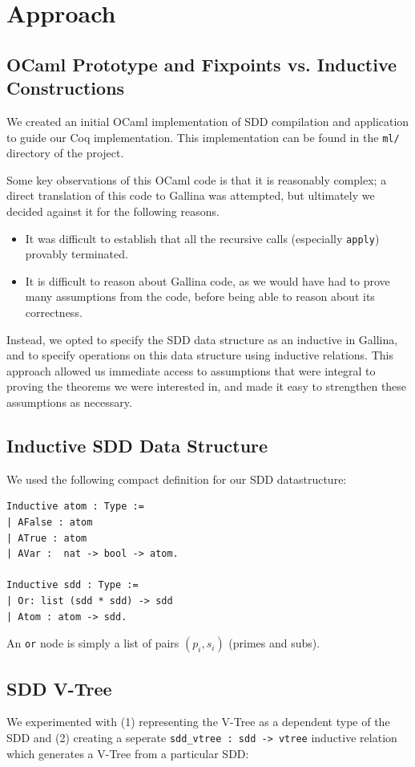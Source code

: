 \documentclass[twocolumn]{article}
\theoremstyle{definition}
\begin{document}
\section{Approach}

\subsection{OCaml Prototype and Fixpoints vs. Inductive Constructions}
We created an initial OCaml implementation of SDD compilation and application to
guide our Coq implementation. This implementation can be found in the
\texttt{ml/} directory of the project.

Some key observations of this OCaml code is that it is reasonably complex; a
direct translation of this code to Gallina was attempted, but ultimately we
decided against it for the following reasons.

\begin{itemize}
\item It was difficult to establish that all the recursive calls (especially
  \texttt{apply}) provably terminated.
\item It is difficult to reason about Gallina code, as we would have had to prove many assumptions from the code, before being able to reason about its correctness.
\end{itemize} 

Instead, we opted to specify the SDD data structure as an inductive in Gallina, and to specify operations on this data structure using inductive relations. This approach allowed us immediate access to assumptions that were integral to proving the theorems we were interested in, and made it easy to strengthen these assumptions as necessary.

\subsection{Inductive SDD Data Structure}
We used the following compact definition for our SDD datastructure:

\begin{verbatim}
Inductive atom : Type :=
| AFalse : atom
| ATrue : atom
| AVar :  nat -> bool -> atom.

Inductive sdd : Type :=
| Or: list (sdd * sdd) -> sdd
| Atom : atom -> sdd.
\end{verbatim}
An \texttt{or} node is simply a list of pairs $(p_i, s_i)$ (primes and subs).

\subsection{SDD V-Tree}\label{sec:vtree}
We experimented with (1) representing the V-Tree as a dependent type of the SDD
and (2) creating a seperate \texttt{sdd\_vtree : sdd -> vtree} inductive relation which
generates a V-Tree from a particular SDD:
\end{document}

